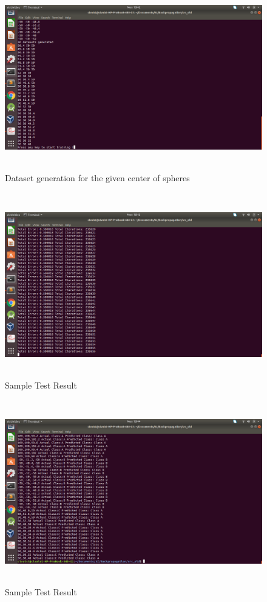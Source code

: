 \documentclass[letterpaper]{article}
\begin{document}
\begin{figure}[h]
\caption{Dataset generation for the given center of spheres}
\centering
\includegraphics[width=15cm,height=8cm]{2dataset.png}
\end{figure}

\begin{figure}[h]
\caption{Sample Test Result}
\centering
\includegraphics[width=15cm,height=8cm]{3training.png}
\end{figure}

\begin{figure}[h]
\caption{Sample Test Result}
\centering
\includegraphics[width=15cm,height=8cm]{4result.png}
\end{figure}
 
\end{document}
